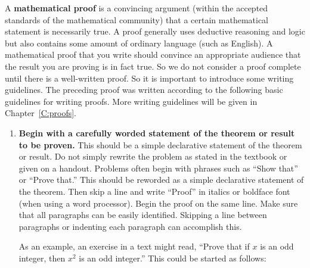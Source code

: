 A \textbf{mathematical proof} is a convincing argument (within the accepted standards of the mathematical community) that a certain %
mathematical statement is necessarily true.  A proof generally uses deductive reasoning and logic but also contains some amount of ordinary language (such as English).  A mathematical proof that you write should convince an appropriate audience that the result you are proving is in fact true. So we do not consider a proof complete until there is a well-written proof.  So it is important to introduce some writing guidelines.  The preceding proof was written according to the following basic guidelines for writing proofs.  More writing guidelines will be given in Chapter~\ref{C:proofs}.
\begin{enumerate}
%


\item \textbf{Begin with a carefully worded statement of the theorem or result to be proven.}
This should be a simple declarative statement of the theorem or result.  Do not simply rewrite the problem as stated in the textbook or given on a handout.  Problems often begin with phrases such as ``Show that'' or ``Prove that.''  This should be reworded as a simple declarative statement of the theorem.  Then skip a line and write ``Proof''  in italics or boldface font (when using a word processor).  Begin the proof on the same line.  Make sure that all paragraphs can be easily identified.  Skipping a line between paragraphs or indenting each paragraph can accomplish this.

As an example, an exercise in a text might read, ``Prove that if $x$  is an odd integer, then $x^2$ is an odd integer.''  This could be started as follows:


\end{enumerate}
